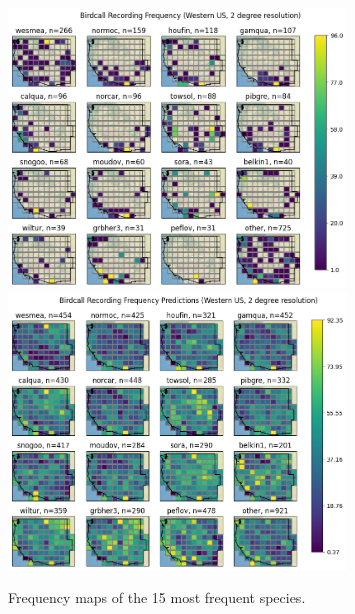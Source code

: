 \documentclass[notitlepage]{article}
\begin{document}
\begin{figure}[H]
\centering
\includegraphics[width=0.8\textwidth]{report/figures/western_us_raw_16.png}
\includegraphics[width=0.8\textwidth]{report/figures/western_us_predict_16.png}
\caption{Frequency maps of the 15 most frequent species.}
\label{fig:map_16}
\end{figure}
\end{document}
